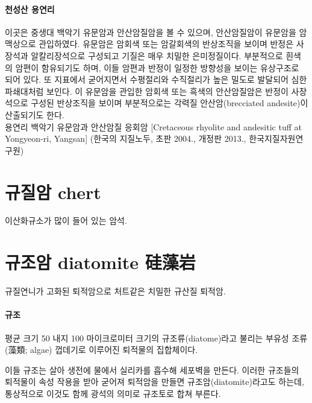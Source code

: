 \documentclass[12pt, a4paper, twoside]{book}
\begin{document}
		\paragraph{천성산 용연리 }
		이곳은 중생대 백악기 유문암과 안산암질암을 볼 수 있으며, 안산암질암이 유문암을 암맥상으로 관입하였다. 
		유문암은 암회색 또는 암갈회색의 반상조직을 보이며 반정은 사장석과 알칼리장석으로 구성되고 기질은 매우 치밀한 은미정질이다. 
		부분적으로 흰색의 암편이 함유되기도 하며, 이들 암편과 반정이 일정한 방향성을 보이는 유상구조로 되어 있다. 
		또 지표에서 굳어지면서 수평절리와 수직절리가 높은 밀도로 발달되어 심한 파쇄대처럼 보인다. 
		이 유문암을 관입한 암회색 또는 흑색의 안산암질암은 반정이 사장석으로 구성된 반상조직을 보이며 
		부분적으로는 각력질 안산암(brecciated andesite)이 산출되기도 한다. \\

		용연리 백악기 유문암과 안산암질 응회암 [Cretaceous rhyolite and andesitic tuff at Yongyeon-ri, Yangsan] (한국의 지질노두, 초판 2004., 개정판 2013., 한국지질자원연구원)








	\clearpage
	\section{규질암 chert}


				이산화규소가 많이 들어 있는 암석.
				

	\clearpage
	\section{규조암 diatomite  硅藻岩 }

	
				규질연니가 고화된 퇴적암으로 처트같은 치밀한 규산질 퇴적암.



			\paragraph{규조}
				평균 크기 50 내지 100 마이크로미터 크기의 규조류(diatome)라고 불리는 부유성 조류(藻類; algae) 껍데기로 이루어진 퇴적물의 집합체이다.

				이들 규조는 살아 생전에 물에서 실리카를 흡수해 세포벽을 만든다. 
				이러한 규조들의 퇴적물이 속성 작용을 받아 굳어져 퇴적암을 만들면 규조암(diatomite)라고도 하는데, 통상적으로 이것도 함께 광석의 의미로 규조토로 합쳐 부른다.
\end{document}

